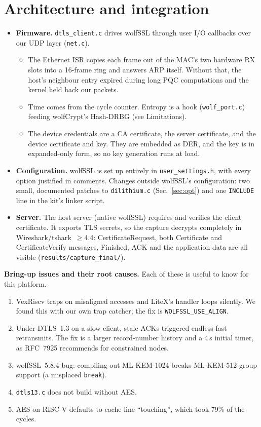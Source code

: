 \documentclass[10pt,a4paper]{article}
\begin{document}
\section{Architecture and integration}
\begin{itemize}
\item \textbf{Firmware.} \texttt{dtls\_client.c} drives wolfSSL through user I/O callbacks over our UDP layer
  (\texttt{net.c}).
  \begin{itemize}
    \item The Ethernet ISR copies each frame out of the MAC's two hardware RX slots into a 16-frame ring and answers
      ARP itself. Without that, the host's neighbour entry expired during long PQC computations and the kernel held
      back our packets.
    \item Time comes from the cycle counter. Entropy is a hook (\texttt{wolf\_port.c}) feeding wolfCrypt's Hash-DRBG
      (see Limitations).
    \item The device credentials are a CA certificate, the server certificate, and the device certificate and key.
      They are embedded as DER, and the key is in expanded-only form, so no key generation runs at load.
  \end{itemize}
\item \textbf{Configuration.} wolfSSL is set up entirely in \texttt{user\_settings.h}, with every option justified
  in comments. Changes outside wolfSSL's configuration: two small, documented patches to \texttt{dilithium.c}
  (Sec.~\ref{sec:opt}) and one \texttt{INCLUDE} line in the kit's linker script.
\item \textbf{Server.} The host server (native wolfSSL) requires and verifies the client certificate.
  It exports TLS secrets, so the capture decrypts completely in Wireshark/tshark~$\geq$4.4:
  CertificateRequest, both Certificate and CertificateVerify messages, Finished, ACK and the application data
  are all visible (\texttt{results/capture\_final/}).
\end{itemize}

\textbf{Bring-up issues and their root causes.} Each of these is useful to know for this platform.
\begin{enumerate}[label=(\arabic*)]
  \item VexRiscv traps on misaligned accesses and LiteX's handler loops silently. We found this with our own trap
    catcher; the fix is \texttt{WOLFSSL\_USE\_ALIGN}.
  \item Under DTLS~1.3 on a slow client, stale ACKs triggered endless fast retransmits. The fix is a larger
    record-number history and a 4\,s initial timer, as RFC~7925 recommends for constrained nodes.
  \item wolfSSL~5.8.4 bug: compiling out ML-KEM-1024 breaks ML-KEM-512 group support (a misplaced \texttt{break}).
  \item \texttt{dtls13.c} does not build without AES.
  \item AES on RISC-V defaults to cache-line ``touching'', which took 79\% of the cycles.
\end{enumerate}
\end{document}
